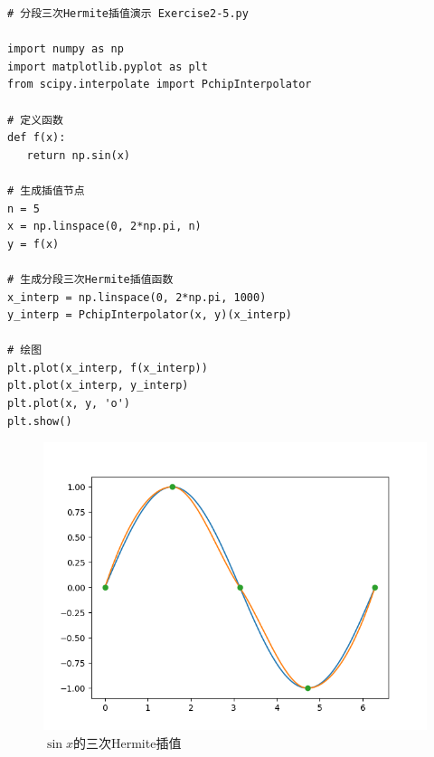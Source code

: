 \begin{lstlisting}
# 分段三次Hermite插值演示 Exercise2-5.py

import numpy as np 
import matplotlib.pyplot as plt 
from scipy.interpolate import PchipInterpolator 

# 定义函数 
def f(x): 
   return np.sin(x)
 
# 生成插值节点 
n = 5 
x = np.linspace(0, 2*np.pi, n)
y = f(x)

# 生成分段三次Hermite插值函数 
x_interp = np.linspace(0, 2*np.pi, 1000)
y_interp = PchipInterpolator(x, y)(x_interp)
 
# 绘图 
plt.plot(x_interp, f(x_interp)) 
plt.plot(x_interp, y_interp) 
plt.plot(x, y, 'o') 
plt.show()
\end{lstlisting}

\begin{figure}[h]
    \centering
    \includegraphics[width=1\linewidth]{Chapter2/graph/python/Figure2-4.png}
    \caption{$\sin{x}$的三次Hermite插值}
    \label{fig:三次Hermite插值}
\end{figure}

